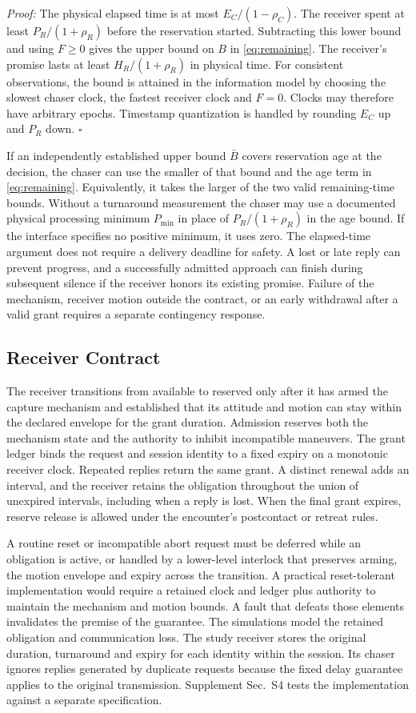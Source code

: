 \documentclass{IEEEtaes}
\begin{document}
\emph{Proof:} The physical elapsed time is at most $E_C/(1-\rho_C)$. The receiver spent at least $P_R/(1+\rho_R)$ before the reservation started. Subtracting this lower bound and using $F\geq0$ gives the upper bound on $B$ in \eqref{eq:remaining}. The receiver's promise lasts at least $H_R/(1+\rho_R)$ in physical time. For consistent observations, the bound is attained in the information model by choosing the slowest chaser clock, the fastest receiver clock and $F=0$. Clocks may therefore have arbitrary epochs. Timestamp quantization is handled by rounding $E_C$ up and $P_R$ down. \hfill$\square$

If an independently established upper bound $\bar B$ covers reservation age at the decision, the chaser can use the smaller of that bound and the age term in \eqref{eq:remaining}. Equivalently, it takes the larger of the two valid remaining-time bounds. Without a turnaround measurement the chaser may use a documented physical processing minimum $P_{\min}$ in place of $P_R/(1+\rho_R)$ in the age bound. If the interface specifies no positive minimum, it uses zero. The elapsed-time argument does not require a delivery deadline for safety. A lost or late reply can prevent progress, and a successfully admitted approach can finish during subsequent silence if the receiver honors its existing promise. Failure of the mechanism, receiver motion outside the contract, or an early withdrawal after a valid grant requires a separate contingency response.

\subsection{Receiver Contract}

The receiver transitions from available to reserved only after it has armed the capture mechanism and established that its attitude and motion can stay within the declared envelope for the grant duration. Admission reserves both the mechanism state and the authority to inhibit incompatible maneuvers. The grant ledger binds the request and session identity to a fixed expiry on a monotonic receiver clock. Repeated replies return the same grant. A distinct renewal adds an interval, and the receiver retains the obligation throughout the union of unexpired intervals, including when a reply is lost. When the final grant expires, reserve release is allowed under the encounter's postcontact or retreat rules.

A routine reset or incompatible abort request must be deferred while an obligation is active, or handled by a lower-level interlock that preserves arming, the motion envelope and expiry across the transition. A practical reset-tolerant implementation would require a retained clock and ledger plus authority to maintain the mechanism and motion bounds. A fault that defeats those elements invalidates the premise of the guarantee. The simulations model the retained obligation and communication loss. The study receiver stores the original duration, turnaround and expiry for each identity within the session. Its chaser ignores replies generated by duplicate requests because the fixed delay guarantee applies to the original transmission. Supplement Sec.~S4 tests the implementation against a separate specification.
\end{document}
